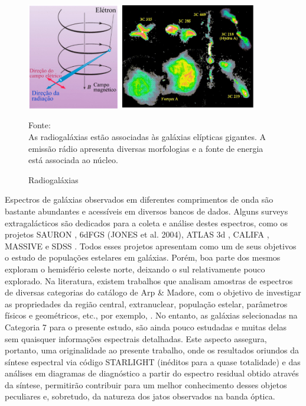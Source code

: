 \begin{figure}[!htb]
	\centering	
    \caption{Radiogaláxias}
    \includegraphics[width=0.9\textwidth]{figuras/radiog_image5.png}
   	\begin{center}
        \normalsize Fonte: \cite{burrows}\\As radiogaláxias estão associadas às galáxias elípticas gigantes. A emissão rádio apresenta diversas morfologias e a fonte de energia está associada ao núcleo.
    \end{center}
	\label{fig:radio-eletro}
\end{figure}

Espectros de galáxias observados em diferentes comprimentos de onda são bastante abundantes e acessíveis em diversos bancos de dados. Alguns surveys extragalácticos são dedicados para a coleta e análise destes espectros, como os projetos SAURON \cite{tim2002sauron}, 6dFGS (JONES et al. 2004), ATLAS 3d \cite{cappellari2011atlas3d}, CALIFA  \cite{sanchez2012califa}, MASSIVE \cite{ma2014massive} e SDSS \cite{alam2015eleventh}. Todos esses projetos apresentam como um de seus objetivos o estudo de populações estelares em galáxias. Porém, boa parte dos mesmos exploram o hemisfério celeste norte, deixando o sul relativamente pouco explorado. Na literatura, existem trabalhos que analisam amostras de espectros de diversas categorias do catálogo de Arp \& Madore, com o objetivo de investigar as propriedades da região central, extranuclear, população estelar, parâmetros físicos e geométricos, etc., por exemplo, \cite{sekiguchi1993spectroscopic,donzelli2000spectroscopic,poppeda2010eso,faundez2015visiting,freitas2017peculiar,krabbe2017interaction}. No entanto, as galáxias selecionadas na Categoria 7 para o presente estudo, são ainda pouco estudadas e muitas delas sem quaisquer informações espectrais detalhadas. Este aspecto assegura, portanto, uma originalidade ao presente trabalho, onde os resultados oriundos da síntese espectral via código STARLIGHT \cite{cid2004star,fernandes2005semi,asari2007history} (inéditos para a quase totalidade) e das análises em diagramas de diagnóstico a partir do espectro residual obtido através da síntese, permitirão contribuir para um melhor conhecimento desses objetos peculiares e, sobretudo, da natureza dos jatos observados na banda óptica.


 



